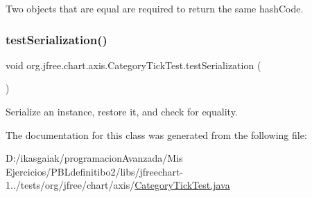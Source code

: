 Two objects that are equal are required to return the same hash\+Code. \mbox{\label{classorg_1_1jfree_1_1chart_1_1axis_1_1_category_tick_test_a0ea103ccfd7313f029ef8e702150eb44}} 
\subsubsection{\texorpdfstring{test\+Serialization()}{testSerialization()}}
{\footnotesize\ttfamily void org.\+jfree.\+chart.\+axis.\+Category\+Tick\+Test.\+test\+Serialization (\begin{DoxyParamCaption}{ }\end{DoxyParamCaption})}

Serialize an instance, restore it, and check for equality. 

The documentation for this class was generated from the following file\+:\begin{DoxyCompactItemize}
\item 
D\+:/ikasgaiak/programacion\+Avanzada/\+Mis Ejercicios/\+P\+B\+Ldefinitibo2/libs/jfreechart-\/1../tests/org/jfree/chart/axis/\mbox{\hyperlink{_category_tick_test_8java}{Category\+Tick\+Test.\+java}}\end{DoxyCompactItemize}
